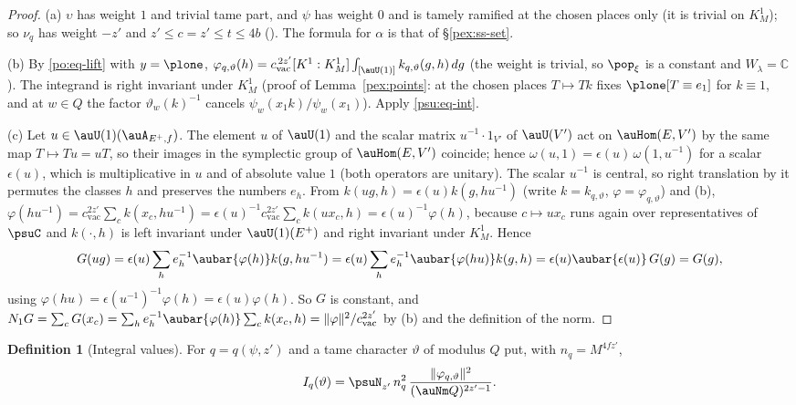 \documentclass[10pt]{amsart}
\theoremstyle{definition}
\newtheorem{definition}[theorem]{Definition}
\theoremstyle{remark}
\newcommand{\C}{\mathbb C}
\begin{document}
\begin{proof}
(a) $\upsilon$ has weight $1$ and trivial tame part, and $\psi$ has weight $0$ and is tamely ramified
at the chosen places only (it is trivial on $K^1_M$); so $\nu_q$ has weight $-z'$ and $z'\le c=z'\le
t\le4b$ ({\cite[Lemma~13.4]{P46}}). The formula for $\alpha$ is that of \S\ref{pex:ss-set}.

(b) By \eqref{po:eq-lift} with $y=\plone$, $\varphi_{q,\vartheta}(h)=c_{\mathrm{vac}}^{\,2z'}[K^1:K^1_M]
\int_{[\auU(1)]}k_{q,\vartheta}(g,h)\,dg$ (the weight is trivial, so $\pop_\xi$ is a constant and
$W_\lambda=\C$). The integrand is right invariant under $K^1_M$ (proof of Lemma~\ref{pex:points}: at
the chosen places $T\mapsto Tk$ fixes $\plone[T\equiv e_1]$ for $k\equiv1$, and at $w\in Q$ the factor
$\vartheta_w(k)^{-1}$ cancels $\psi_w(x_1k)/\psi_w(x_1)$). Apply \eqref{psu:eq-int}.

(c) Let $u\in\auU(1)(\auA_{E^+,f})$. The element $u$ of $\auU(1)$ and the scalar matrix $u^{-1}\cdot
1_{V'}$ of $\auU(V')$ act on $\auHom(E,V')$ by the same map $T\mapsto Tu=uT$, so their images in the
symplectic group of $\auHom(E,V')$ coincide; hence $\omega(u,1)=\epsilon(u)\,\omega(1,u^{-1})$ for a
scalar $\epsilon(u)$, which is multiplicative in $u$ and of absolute value $1$ (both operators are
unitary). The scalar $u^{-1}$ is central, so right translation by it permutes the classes $h$ and
preserves the numbers $e_h$. From $k(ug,h)=\epsilon(u)k(g,hu^{-1})$ (write $k=k_{q,\vartheta}$, $\varphi
=\varphi_{q,\vartheta}$) and (b), $\varphi(hu^{-1})=c_{\mathrm{vac}}^{2z'}\sum_ck(x_c,hu^{-1})=
\epsilon(u)^{-1}c_{\mathrm{vac}}^{2z'}\sum_ck(ux_c,h)=\epsilon(u)^{-1}\varphi(h)$, because $c\mapsto
ux_c$ runs again over representatives of $\psuC$ and $k(\cdot,h)$ is left invariant under
$\auU(1)(E^+)$ and right invariant under $K^1_M$. Hence
\[
G(ug)=\epsilon(u)\sum_he_h^{-1}\aubar{\varphi(h)}k(g,hu^{-1})=\epsilon(u)\sum_he_h^{-1}
\aubar{\varphi(hu)}k(g,h)=\epsilon(u)\aubar{\epsilon(u)}\,G(g)=G(g),
\]
using $\varphi(hu)=\epsilon(u^{-1})^{-1}\varphi(h)=\epsilon(u)\varphi(h)$. So $G$ is constant, and
$N_1G=\sum_cG(x_c)=\sum_he_h^{-1}\aubar{\varphi(h)}\sum_ck(x_c,h)=\|\varphi\|^2/c_{\mathrm{vac}}^{2z'}$ by
(b) and the definition of the norm.
\end{proof}

\begin{definition}[Integral values]\label{psu:def-I}
For $q=q(\psi,z')$ and a tame character $\vartheta$ of modulus $Q$ put, with $n_q=M^{4fz'}$,
\[
I_q(\vartheta)=\psuN_{z'}\,n_q^2\,\frac{\|\varphi_{q,\vartheta}\|^2}{(\auNm Q)^{2z'-1}} .
\]
\end{definition}
\end{document}
